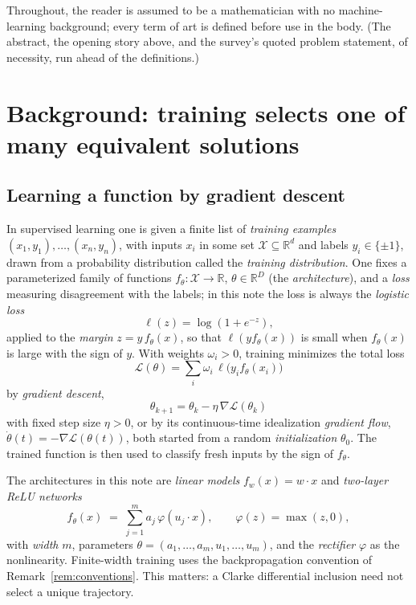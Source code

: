 \documentclass[11pt]{amsart}
\theoremstyle{plain}
\theoremstyle{definition}
\begin{document}
Throughout, the reader is assumed to be a mathematician with no machine-learning background; every term of art is defined before use in the body. (The abstract, the opening story above, and the survey's quoted problem statement, of necessity, run ahead of the definitions.)

\section{Background: training selects one of many equivalent solutions}\label{sec:background}

\subsection{Learning a function by gradient descent}
In supervised learning one is given a finite list of \emph{training examples} $(x_1,y_1),\dots,(x_n,y_n)$, with inputs $x_i$ in some set $\mathcal X\subseteq\mathbb R^d$ and labels $y_i\in\{\pm1\}$, drawn from a probability distribution called the \emph{training distribution}. One fixes a parameterized family of functions $f_\theta:\mathcal X\to\mathbb R$, $\theta\in\mathbb R^D$ (the \emph{architecture}), and a \emph{loss} measuring disagreement with the labels; in this note the loss is always the \emph{logistic loss}
\[
   \ell(z)=\log(1+e^{-z}),
\]
applied to the \emph{margin} $z=y\,f_\theta(x)$, so that $\ell(yf_\theta(x))$ is small when $f_\theta(x)$ is large with the sign of $y$. With weights $\omega_i>0$, training minimizes the total loss
\[
   \mathcal L(\theta)=\sum_i \omega_i\,\ell\bigl(y_i f_\theta(x_i)\bigr)
\]
by \emph{gradient descent},
\[
   \theta_{k+1}=\theta_k-\eta\,\nabla\mathcal L(\theta_k)
\]
with fixed step size $\eta>0$, or by its continuous-time idealization \emph{gradient flow}, $\dot\theta(t)=-\nabla\mathcal L(\theta(t))$, both started from a random \emph{initialization} $\theta_0$. The trained function is then used to classify fresh inputs by the sign of $f_\theta$.

The architectures in this note are \emph{linear models} $f_w(x)=w\cdot x$ and \emph{two-layer ReLU networks}
\begin{equation}\label{eq:twolayer}
   f_\theta(x)\;=\;\sum_{j=1}^m a_j\,\varphi(u_j\cdot x),
   \qquad \varphi(z)=\max(z,0),
\end{equation}
with \emph{width} $m$, parameters $\theta=(a_1,\dots,a_m,u_1,\dots,u_m)$, and the \emph{rectifier} $\varphi$ as the nonlinearity. Finite-width training uses the backpropagation convention of Remark~\ref{rem:conventions}. This matters: a Clarke differential inclusion need not select a unique trajectory.
\end{document}
